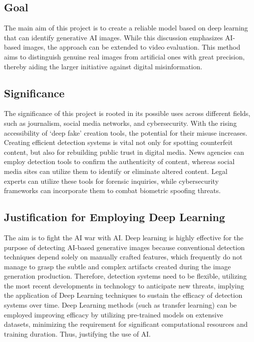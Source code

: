 \documentclass{article} %
\begin{document}
\subsection{Goal}
The main aim of this project is to create a reliable model based on deep learning that can identify generative AI images. While this discussion emphasizes AI-based images, the approach can be extended to video evaluation. 
This method aims to distinguish genuine real images from artificial ones with great precision, thereby aiding the larger initiative against digital misinformation. 

\subsection{Significance}
The significance of this project is rooted in its possible uses across different fields, such as journalism, social media networks, and cybersecurity. With the rising accessibility of `deep fake' creation tools, the potential for their misuse increases. Creating efficient detection systems is vital not only for spotting counterfeit content, but also for rebuilding public trust in digital media. News agencies can employ detection tools to confirm the authenticity of content\citep{Kumarage2023}, whereas social media sites can utilize them to identify or eliminate altered content\citep{clickinsights2023}. Legal experts can utilize these tools for forensic inquiries\citep{Ketsekioulafis2024}, while cybersecurity frameworks can incorporate them to combat biometric spoofing threats\citep{biometricupdate2024}.

\subsection{Justification for Employing Deep Learning}
The aim is to fight the AI war with AI. Deep learning is highly effective for the purpose of detecting AI-based generative images because conventional detection techniques depend solely on manually crafted features, which frequently do not manage to grasp the subtle and complex artifacts created during the image generation production. Therefore, detection systems need to be flexible, utilizing the most recent developments in technology to anticipate new threats, implying the application of Deep Learning techniques to sustain the efficacy of detection systems over time\citep{ledig2017}. Deep Learning methods (such as transfer learning) can be employed improving efficacy by utilizing pre-trained models on extensive datasets, minimizing the requirement for significant computational resources and training duration\citep{srivastava2014}. Thus, justifying the use of AI.
\end{document}
